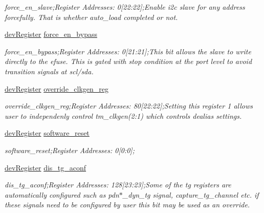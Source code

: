 \begin{DoxyCompactItemize}
\begin{DoxyCompactList}\small\item\em force\+\_\+en\+\_\+slave;Register Addresses\+: 0\mbox{[}22\+:22\mbox{]};Enable i2c slave for any address forcefully. That is whether auto\+\_\+load completed or not. \end{DoxyCompactList}\item 
\mbox{\hyperlink{classdev_register}{dev\+Register}} \mbox{\hyperlink{class_o_p_t3101_registers_a6b339a3123e0f39c5598cc35d6f87162}{force\+\_\+en\+\_\+bypass}}
\begin{DoxyCompactList}\small\item\em force\+\_\+en\+\_\+bypass;Register Addresses\+: 0\mbox{[}21\+:21\mbox{]};This bit allows the slave to write directly to the efuse. This is gated with stop condition at the port level to avoid transition signals at scl/sda. \end{DoxyCompactList}\item 
\mbox{\hyperlink{classdev_register}{dev\+Register}} \mbox{\hyperlink{class_o_p_t3101_registers_a0c481a59621a3bbcd5e54a33e83fdb28}{override\+\_\+clkgen\+\_\+reg}}
\begin{DoxyCompactList}\small\item\em override\+\_\+clkgen\+\_\+reg;Register Addresses\+: 80\mbox{[}22\+:22\mbox{]};Setting this register \textquotesingle{}1\textquotesingle{} allows user to independenly control tm\+\_\+clkgen(2\+:1) which controls dealias settings. \end{DoxyCompactList}\item 
\mbox{\hyperlink{classdev_register}{dev\+Register}} \mbox{\hyperlink{class_o_p_t3101_registers_a9d737192cc86c4334c520e5dcc534947}{software\+\_\+reset}}
\begin{DoxyCompactList}\small\item\em software\+\_\+reset;Register Addresses\+: 0\mbox{[}0\+:0\mbox{]}; \end{DoxyCompactList}\item 
\mbox{\hyperlink{classdev_register}{dev\+Register}} \mbox{\hyperlink{class_o_p_t3101_registers_ae211b892794c64ec81136e48f0536ea4}{dis\+\_\+tg\+\_\+aconf}}
\begin{DoxyCompactList}\small\item\em dis\+\_\+tg\+\_\+aconf;Register Addresses\+: 128\mbox{[}23\+:23\mbox{]};Some of the tg registers are automatically configured such as pdn$\ast$\+\_\+dyn\+\_\+tg signal, capture\+\_\+tg\+\_\+channel etc. if these signals need to be configured by user this bit may be used as an override. \end{DoxyCompactList}\item 

\end{DoxyCompactItemize}
